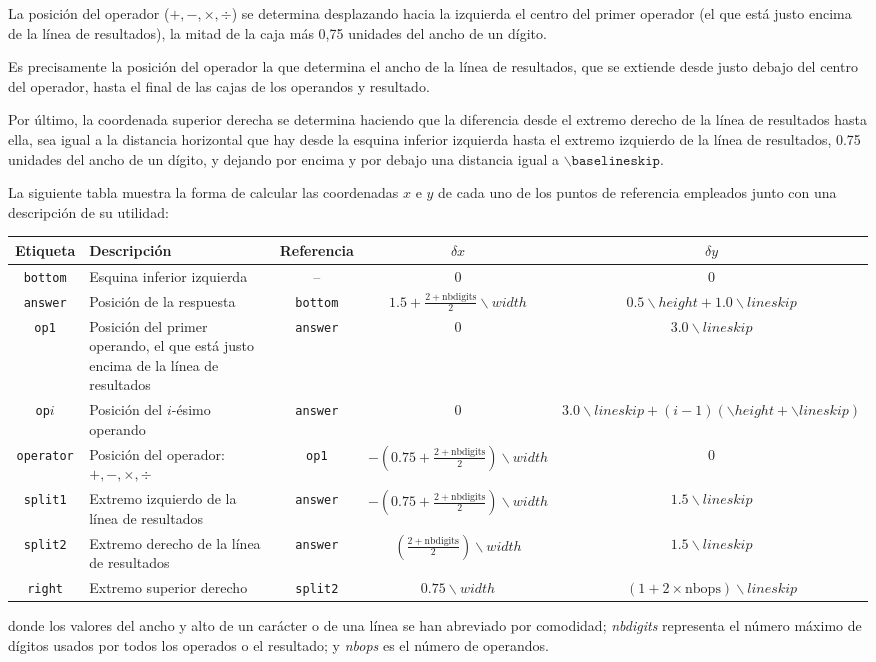 \documentclass[svgnames,addpoints]{exam}
\begin{document}
La posición del operador ($+, -, \times, \div$) se determina desplazando hacia
la izquierda el centro del primer operador (el que está justo encima de la
línea de resultados), la mitad de la caja más 0,75 unidades del ancho de un
dígito.

Es precisamente la posición del operador la que determina el ancho de la línea
de resultados, que se extiende desde justo debajo del centro del operador,
hasta el final de las cajas de los operandos y resultado.

Por último, la coordenada superior derecha se determina haciendo que la
diferencia desde el extremo derecho de la línea de resultados hasta ella, sea
igual a la distancia horizontal que hay desde la esquina inferior izquierda
hasta el extremo izquierdo de la línea de resultados, 0.75 unidades del ancho
de un dígito, y dejando por encima y por debajo una distancia igual a
$\backslash\mathtt{baselineskip}$.

La siguiente tabla muestra la forma de calcular las coordenadas $x$ e $y$ de
cada uno de los puntos de referencia empleados junto con una descripción de su
utilidad:

\begin{center}
  \begin{tabular}{c|p{2.0cm}|c|c|c}
    Etiqueta & Descripción & Referencia & $\delta x$ & $\delta y$ \\ \toprule
    \texttt{bottom} & Esquina inferior izquierda & -- & 0 & 0 \\ \midrule
    \texttt{answer} & Posición de la respuesta & \texttt{bottom}&  $1.5+\frac{2+\textrm{nbdigits}}{2}\backslash width$ & $0.5\backslash height+1.0\backslash lineskip$ \\  \midrule
    \texttt{op1} & Posición del primer operando, el que está justo encima de la línea de resultados & \texttt{answer} & 0 & $3.0\backslash lineskip$ \\  \midrule
    \texttt{op}$i$ & Posición del $i$-ésimo operando & \texttt{answer} & 0 & $3.0\backslash lineskip + (i-1) (\backslash height + \backslash lineskip)$ \\  \midrule
    \texttt{operator} & Posición del operador: $+, -, \times, \div$ & \texttt{op1} & $-\left(0.75+\frac{2+\textrm{nbdigits}}{2}\right)\backslash width$ & 0 \\  \midrule
    \texttt{split1} & Extremo izquierdo de la línea de resultados & \texttt{answer} & $-\left(0.75+\frac{2+\textrm{nbdigits}}{2}\right)\backslash width$ & $1.5\backslash lineskip$ \\  \midrule
    \texttt{split2} & Extremo derecho de la línea de resultados & \texttt{answer} & $\left(\frac{2+\textrm{nbdigits}}{2}\right)\backslash width$ & $1.5\backslash lineskip$ \\ \midrule
    \texttt{right} & Extremo superior derecho & \texttt{split2} & $0.75\backslash width$ & $(1 + 2\times \mathrm{nbops})\backslash lineskip$ \\ \bottomrule
  \end{tabular}
\end{center}

\noindent
donde los valores del ancho y alto de un carácter o de una línea se han
abreviado por comodidad; \textit{nbdigits} representa el número máximo de
dígitos usados por todos los operados o el resultado; y \textit{nbops} es el
número de operandos.
\end{document}
